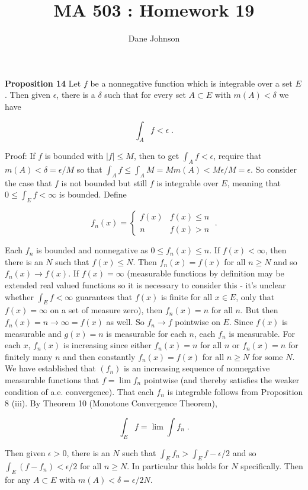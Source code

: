 \documentclass[a4paper]{article}
\title{MA 503 : Homework 19}
\author{Dane Johnson}
\begin{document}
\maketitle

{\bf Proposition 14} Let $f$ be a nonnegative function which is integrable over a set $E$. Then given $\epsilon$, there is a $\delta$ such that for every set $A \subset E$ with $m(A) < \delta$ we have 

$$\int_A f < \epsilon \;.$$

Proof: If $f$ is bounded with $|f| \leq M$, then to get $\int_A f < \epsilon$, require that $m(A) < \delta = \epsilon / M$ so that $\int_A f \leq \int_A M = Mm(A) < M\epsilon / M = \epsilon$. So consider the case that $f$ is not bounded but still $f$ is integrable over $E$, meaning that $0 \leq \int_E f < \infty$ is bounded. Define

$$f_n(x) = \begin{cases}
f(x) & f(x) \leq n \\ n & f(x) > n \end{cases} \;. $$

Each $f_n$ is bounded and nonnegative as $0\leq f_n(x) \leq n$. If $f(x) <\infty$, then there is an $N$ such that $f(x) \leq N$. Then $f_n(x) = f(x)$ for all $n \geq N$ and so $f_n(x) \rightarrow f(x)$. If $f(x) = \infty$ (measurable functions by definition may be extended real valued functions so it is necessary to consider this - it's unclear whether $\int_E f < \infty$ guarantees that $f(x)$ is finite for all $x \in E$, only that $f(x) = \infty$ on a set of measure zero), then $f_n(x) = n$ for all $n$. But then $f_n(x) = n \rightarrow \infty = f(x)$ as well. So $f_n \rightarrow f$ pointwise on $E$. Since $f(x)$ is measurable and $g(x) = n$ is measurable for each $n$, each $f_n$ is measurable. For each $x$, $f_n(x)$ is increasing since either $f_n(x) = n$ for all $n$ or $f_n(x) = n$ for finitely many $n$ and then constantly $f_n(x) = f(x)$ for all $n\geq N$ for some $N$. We have established that $(f_n)$ is an increasing sequence of nonnegative measurable functions that $f = \lim f_n$ pointwise (and thereby satisfies the weaker condition of a.e. convergence). That each $f_n$ is integrable follows from Proposition 8 (iii). By Theorem 10 (Monotone Convergence Theorem), 

$$\int_E f = \lim \int f_n \;.$$

Then given $\epsilon > 0$, there is an $N$ such that $\int_E f_n > \int_E f - \epsilon /2$ and so $\int_E (f - f_n) < \epsilon /2 $ for all $n\geq N$. In particular this holds for $N$ specifically. Then for any $A \subset E$ with $m(A) < \delta = \epsilon / 2N$.
\end{document}
